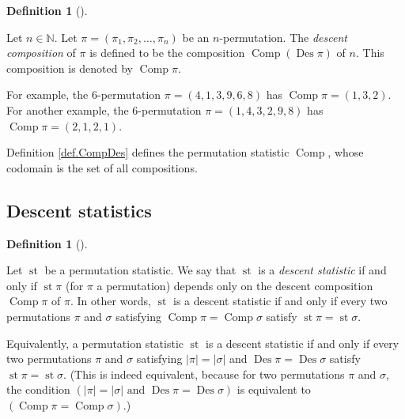\documentclass[numbers=enddot,12pt,final,onecolumn,notitlepage]{scrartcl}%
\theoremstyle{definition}
\newtheorem{defi}[theo]{Definition}
\newenvironment{definition}[1][]
{\begin{defi}[#1]\begin{leftbar}}
{\end{leftbar}\end{defi}}
\begin{document}
\begin{definition}
\label{def.CompDes}Let $n\in\mathbb{N}$. Let $\pi=\left(  \pi_{1},\pi
_{2},\ldots,\pi_{n}\right)  $ be an $n$-permutation. The \textit{descent
composition} of $\pi$ is defined to be the composition $\operatorname*{Comp}%
\left(  \operatorname{Des}\pi\right)  $ of $n$. This composition is denoted
by $\operatorname*{Comp}\pi$.
\end{definition}

For example, the $6$-permutation $\pi=\left(  4,1,3,9,6,8\right)  $ has
$\operatorname*{Comp}\pi=\left(  1,3,2\right)  $. For another example, the
$6$-permutation $\pi=\left(  1,4,3,2,9,8\right)  $ has $\operatorname*{Comp}%
\pi=\left(  2,1,2,1\right)  $.

Definition \ref{def.CompDes} defines the permutation statistic
$\operatorname*{Comp}$, whose codomain is the set of all compositions.

\subsection{Descent statistics}

\begin{definition}
Let $\operatorname{st}$ be a permutation statistic. We say that
$\operatorname{st}$ is a \textit{descent statistic} if and only if
$\operatorname{st}\pi$ (for $\pi$ a permutation) depends only on the descent
composition $\operatorname*{Comp}\pi$ of $\pi$. In other words,
$\operatorname{st}$ is a descent statistic if and only if every two
permutations $\pi$ and $\sigma$ satisfying $\operatorname*{Comp}%
\pi=\operatorname*{Comp}\sigma$ satisfy $\operatorname{st}\pi
=\operatorname{st}\sigma$.
\end{definition}

Equivalently, a permutation statistic $\operatorname{st}$ is a descent
statistic if and only if every two permutations $\pi$ and $\sigma$ satisfying
$\left\vert \pi\right\vert =\left\vert \sigma\right\vert $ and
$\operatorname{Des}\pi=\operatorname{Des}\sigma$ satisfy $\operatorname{st}
\pi=\operatorname{st}\sigma$. (This is indeed equivalent, because for two
permutations $\pi$ and $\sigma$, the condition $\left(  \left\vert
\pi\right\vert =\left\vert \sigma\right\vert \text{ and }\operatorname{Des}
\pi=\operatorname{Des}\sigma\right)  $ is equivalent to $\left(
\operatorname*{Comp}\pi=\operatorname*{Comp}\sigma\right)  $.)
\end{document}
